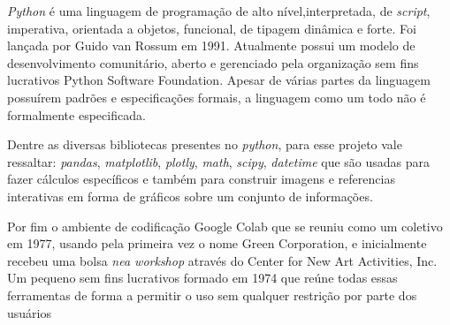 \textit{Python} é uma linguagem de programação de alto nível,interpretada, de \textit{script}, imperativa, orientada a objetos, funcional, de tipagem dinâmica e forte. Foi lançada por Guido van Rossum em 1991. Atualmente possui um modelo de desenvolvimento comunitário, aberto e gerenciado pela organização sem fins lucrativos Python Software Foundation. Apesar de várias partes da linguagem possuírem padrões e especificações formais, a linguagem como um todo não é formalmente especificada.

Dentre as diversas bibliotecas presentes no \textit{python}, para esse projeto vale ressaltar: \textit{pandas}, \textit{matplotlib}, \textit{plotly}, \textit{math}, \textit{scipy}, \textit{datetime} que são usadas para fazer cálculos específicos e também para construir imagens e referencias interativas em forma de gráficos sobre um conjunto de informações.

Por fim o ambiente de codificação Google Colab que se reuniu como um coletivo em 1977, usando pela primeira vez o nome Green Corporation, e inicialmente recebeu uma bolsa \textit{nea workshop} através do Center for New Art Activities, Inc. Um pequeno sem fins lucrativos formado em 1974 que reúne todas essas ferramentas de forma a permitir o uso sem qualquer restrição por parte dos usuários
